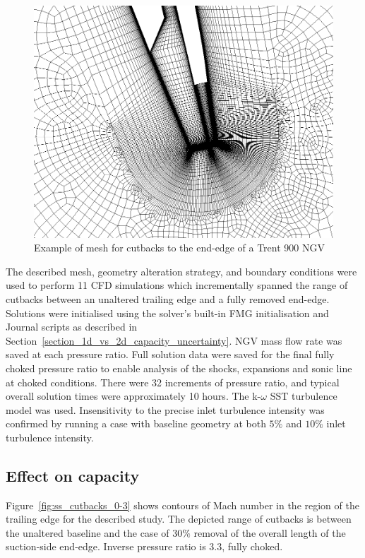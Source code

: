 \documentclass[a4paper, 11pt, oneside]{report}
\begin{document}
\begin{figure}[H]
      \centering
      \includegraphics[width=.9\textwidth]{figs/T900_ss_cutbacks_mesh.png}
      \caption{Example of mesh for cutbacks to the end-edge of a Trent 900 NGV}
      \label{fig:T900_ss_cutbacks_mesh}
\end{figure}

The described mesh, geometry alteration strategy, and boundary conditions were used to perform 11 CFD simulations which incrementally spanned the range of cutbacks between an unaltered trailing edge and a fully removed end-edge. Solutions were initialised using the solver's built-in FMG initialisation and Journal scripts as described in Section~\ref{section_1d_vs_2d_capacity_uncertainty}. NGV mass flow rate was saved at each pressure ratio. Full solution data were saved for the final fully choked pressure ratio to enable analysis of the shocks, expansions and sonic line at choked conditions. There were 32 increments of pressure ratio, and typical overall solution times were approximately 10 hours. The k-$\omega$ SST turbulence model was used. Insensitivity to the precise inlet turbulence intensity was confirmed by running a case with baseline geometry at both $5\%$ and $10\%$ inlet turbulence intensity.

\subsection{Effect on capacity}

Figure~\ref{fig:ss_cutbacks_0-3} shows contours of Mach number in the region of the trailing edge for the described study. The depicted range of cutbacks is between the unaltered baseline and the case of $30\%$ removal of the overall length of the suction-side end-edge. Inverse pressure ratio is $3.3$, fully choked.
\end{document}
